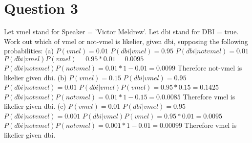 \documentclass[12pt]{report}
\begin{document}
\section{Question 3}
Let vmel stand for Speaker = 'Victor Meldrew'.
\newline
Let dbi stand for DBI = true.
\newline
\newline
Work out which of vmel or not-vmel is likelier, given dbi, supposing the following probabilities:
\newline
(a) 
\newline
$P(vmel) = 0.01$
\newline
$P(dbi|vmel) = 0.95$
\newline
$P(dbi|not vmel) = 0.01$
\newline
\newline
$P(dbi|vmel)P(vmel) = 0.95 * 0.01 = 0.0095$
\newline
$P(dbi|not vmel)P(not vmel) = 0.01 * 1-0.01 = 0.0099$
\newline
Therefore not-vmel is likelier given dbi.
\newline
\newline
(b)
\newline
$P(vmel) = 0.15$
\newline
$P(dbi|vmel) = 0.95$
\newline
$P(dbi|not vmel) = 0.01$
\newline
\newline
$P(dbi|vmel)P(vmel) = 0.95 * 0.15 = 0.1425$
\newline
$P(dbi|not vmel)P(not vmel) = 0.01 * 1-0.15 = 0.0.0085$
\newline
Therefore vmel is likelier given dbi.
\newline
\newline
(c)
\newline
$P(vmel) = 0.01$
\newline
$P(dbi|vmel) = 0.95$
\newline
$P(dbi|not vmel) = 0.001$
\newline
\newline
$P(dbi|vmel)P(vmel) = 0.95 * 0.01 = 0.0095$
\newline
$P(dbi|not vmel)P(not vmel) = 0.001 * 1-0.01 = 0.00099$
\newline
Therefore vmel is likelier given dbi.
\newline
\newline
\end{document}
